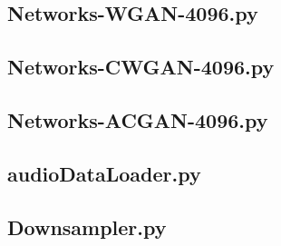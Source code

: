 \documentclass[a4paper, titlepage]{article}
\newcommand*{\CodePath}{../Code/}%
\begin{document}
\begin{appendices}
  

  \newpage

  \subsection{Networks-WGAN-4096.py}

  

  \newpage

  \subsection{Networks-CWGAN-4096.py}

  

  \newpage

  \subsection{Networks-ACGAN-4096.py}

  

  \newpage

  \subsection{audioDataLoader.py}

  

  \newpage

  \subsection{Downsampler.py}

  

\end{appendices}

\end{document}
